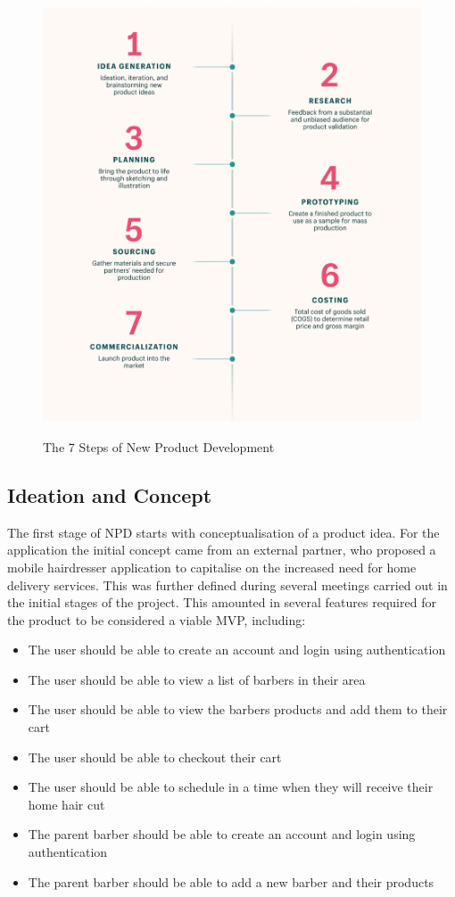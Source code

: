 \documentclass[12pt]{article}
\begin{document}
	\begin{figure}[H]
		\centering
		\includegraphics[scale=0.15]{images/npd.png}
		\caption{The 7 Steps of New Product Development}
		\label{fig:npd} \cite{shopifyWhatProductDevelopment}
	\end{figure}
	
	
	\subsection{Ideation and Concept}
	\label{ideation-concept}
	The first stage of NPD starts with conceptualisation of a product idea. For the application the initial concept came from an external partner, who proposed a mobile hairdresser application to capitalise on the increased need for home delivery services. This was further defined during several meetings carried out in the initial stages of the project. This amounted in several features required for the product to be considered a viable MVP, including:
	\begin{itemize}
		\item The user should be able to create an account and login using authentication
		\item The user should be able to view a list of barbers in their area
		\item The user should be able to view the barbers products and add them to their cart
		\item The user should be able to checkout their cart
		\item The user should be able to schedule in a time when they will receive their home hair cut
		\item The parent barber should be able to create an account and login using authentication
		\item The parent barber should be able to add a new barber and their products

	\end{itemize}
\end{document}
